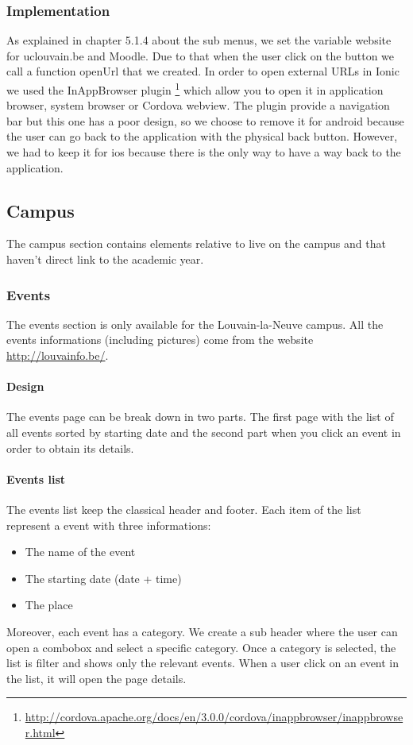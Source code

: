 \documentclass[11pt, a4paper]{report}
\begin{document}
\subsubsection{Implementation}
As explained in chapter 5.1.4 about the sub menus, we set the variable website for uclouvain.be and Moodle. Due to that when the user click on the button we call a function openUrl that we created. In order to open external URLs in Ionic we used the InAppBrowser plugin \footnote{\url{http://cordova.apache.org/docs/en/3.0.0/cordova/inappbrowser/inappbrowser.html}} which allow you to open it in application browser, system browser or Cordova webview. The plugin provide a navigation bar but this one has a poor design, so we choose to remove it for android because the user can go back to the application with the physical back button. However, we had to keep it for ios because there is the only way to have a way back to the application. 

\subsection{Campus}
The campus section contains elements relative to live on the campus and that haven't direct link to the academic year. 

\subsubsection{Events}
The events section is only available for the Louvain-la-Neuve campus. All the events informations (including pictures) come from the website \url{http://louvainfo.be/}.
\paragraph{Design}
The events page can be break down in two parts. The first page with the list of all events sorted by starting date and the second part when you click an event in order to obtain its details. 
\paragraph{Events list}
The events list keep the classical header and footer. Each item of the list represent a event with three informations:
\begin{itemize}
\item The name of the event
\item The starting date (date + time)
\item The place
\end{itemize}
Moreover, each event has a category. We create a sub header where the user can open a combobox and select a specific category. Once a category is selected, the list is filter and shows only the relevant events. When a user click on an event in the list, it will open the page details.
\end{document}
